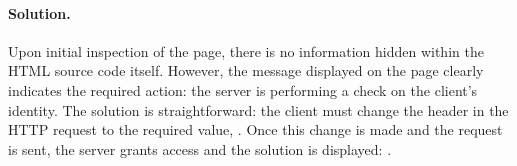 \paragraph{Solution.} Upon initial inspection of the page, there is no information hidden within the HTML source code itself. However, the message displayed on the page clearly indicates the required action: the server is performing a check on the client's identity. The solution is straightforward: the client must change the  header in the HTTP request to the required value, . Once this change is made and the request is sent, the server grants access and the solution is displayed: .